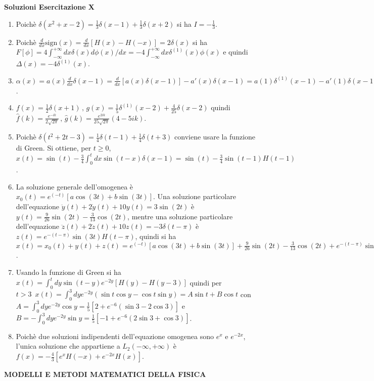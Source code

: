 \documentclass[a4paper,10pt]{article}
\begin{document}
\centerline{\LARGE \bf Soluzioni Esercitazione X}
\vskip10pt
\begin{enumerate}
\item Poich\`e $\delta(x^2+x-2)=\frac13 \delta(x-1) + \frac13 \delta (x+2)$ si ha $I=-\frac13$.
\item Poich\`e $\frac{d}{dx} \text{sign}(x)=\frac{d}{dx} [H(x)-H(-x)]=2\delta(x)$ si ha $F[\phi]=4\int_{-\infty}^{+\infty}dx\delta(x)d\phi(x)/dx=-4\int_{-\infty}^{+\infty} dx \delta^{(1)}(x) \phi(x)$ e quindi $\Delta(x)=-4\delta^{(1)}(x)$.
\item $\alpha(x)=a(x)\frac{d}{dx}\delta(x-1)=\frac{d}{dx}[a(x)\delta(x-1)]- a'(x)\delta(x-1)= a(1)\delta^{(1)}(x-1)-a'(1)\delta(x-1)$.
\item $f(x)=\frac12 \delta(x+1)\,,\,g(x)=\frac15 \delta^{(1)}(x-2)+\frac{4}{25} \delta(x-2)$ quindi $\hat{f}(k)=\frac{e^{-ik}}{2\sqrt{2\pi}}\,,\,\hat{g}(k)=\frac{e^{2ik}}{25\sqrt{2\pi}}(4-5ik)$.
\item Poich\`e $\delta(t^2+2t-3)=\frac14 \delta(t-1)+\frac14 \delta(t+3)$ conviene usare la funzione di Green. Si ottiene, per $t\geq 0$, $x(t)=\sin(t)-\frac34 \int_0^t dx \sin(t-x)\delta(x-1)= \sin(t)-\frac34 \sin(t-1) H(t-1)$.
\item La soluzione generale dell'omogenea \`e $x_0(t)=e^{(-t)}[a\cos(3t)+b\sin(3t)]$. Una soluzione particolare dell'equazione $\ddot{y}(t)+2\dot{y}(t)+10y(t)=3\sin(2t)$ \`e $y(t)=\frac{9}{26} \sin(2t)-\frac{3}{13} \cos(2t)$, mentre una soluzione particolare dell'equazione $\ddot{z}(t)+2\dot{z}(t)+10z(t)=-3\delta(t-\pi)$ \`e $z(t)=e^{-(t-\pi)} \sin(3t) H(t-\pi)$, quindi si ha $x(t)=x_0(t)+y(t)+z(t)=e^{(-t)}[a\cos(3t)+b\sin(3t)]+\frac{9}{26} \sin(2t)-\frac{3}{13} \cos(2t)+e^{-(t-\pi)} \sin(3t) H(t-\pi)$.
\item Usando la funzione di Green si ha $x(t)=\int_0^t dy\sin(t-y) e^{-2y}[H(y)-H(y-3)]$ quindi per $t>3\,\,\,x(t)=\int_0^3dy e^{-2y}(\sin t \cos y -\cos t \sin y)= A \sin t +B \cos t$ con $A=\int_0^3 dy e^{-2y}\cos y=\frac15 [2+e^{-6} (\sin 3 -2\cos 3)]$ e $B=-\int_0^3 dy e^{-2y} \sin y= \frac15 [-1+e^{-6} (2\sin 3+\cos 3)]$. 
\item Poich\`e due soluzioni indipendenti dell'equazione omogenea sono $e^x$ e $e^{-2x}$, l'unica soluzione che appartiene a $L_2(-\infty, +\infty)$ \`e $f(x)=-\frac43 [e^x H(-x) + e^{-2x}H(x)]$.

\end{enumerate}

\newpage



\centerline{\bf MODELLI E METODI MATEMATICI DELLA FISICA}
\end{document}
